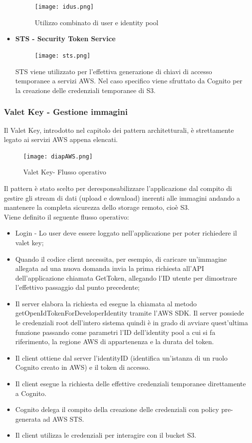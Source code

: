 \documentclass[12pt]{article}
\begin{document}
\begin{itemize}
\begin{itemize}
				\end{itemize}
				\begin{figure}[H]
					\texttt{[image: idus.png]}
					\caption{Utilizzo combinato di user e identity pool}
				\end{figure}
				\item \textbf{STS - Security Token Service}
				\begin{figure}[H]
					\texttt{[image: sts.png]}
				\end{figure}
				STS viene utilizzato per l'effettiva generazione di chiavi di accesso temporanee a servizi AWS. Nel caso specifico viene sfruttato da Cognito per la creazione delle credenziali temporanee di S3.
				
			\end{itemize}
			
			\newpage
			\subsubsection{Valet Key - Gestione immagini}
			\label{sec:valet}
			Il Valet Key, introdotto nel capitolo dei pattern architetturali, è strettamente legato ai servizi AWS appena elencati.
			\begin{figure}[H]
				\texttt{[image: diapAWS.png]}
				\caption{Valet Key- Flusso operativo}
			\end{figure}
			Il pattern è stato scelto per deresponsabilizzare l'applicazione dal compito di gestire gli stream di dati (upload e download) inerenti alle immagini andando a mantenere la completa sicurezza dello storage remoto, cioè S3.\\
			Viene definito il seguente flusso operativo:
			\begin{itemize}
				\item Login - Lo user deve essere loggato nell'applicazione per poter richiedere il valet key;
				\item Quando il codice client necessita, per esempio, di caricare un'immagine allegata ad una nuova domanda invia la prima richiesta all'API dell'applicazione chiamata GetToken, allegando l'ID utente per dimostrare l'effettivo passaggio dal punto precedente;
				\item Il server elabora la richiesta ed esegue la chiamata al metodo getOpenIdTokenForDeveloperIdentity tramite l'AWS SDK. Il server possiede le credenziali root dell'intero sistema quindi è in grado di avviare quest'ultima funzione passando come parametri l'ID dell'identity pool a cui si fa riferimento, la regione AWS di appartenenza e la durata del token.
				\item Il client ottiene dal server l'identityID (identifica un'istanza di un ruolo Cognito creato in AWS) e il token di accesso.
				\item Il client esegue la richiesta delle effettive credenziali temporanee direttamente a Cognito.
				\item Cognito delega il compito della creazione delle credenziali con policy pre-generata ad AWS STS.
				\item Il client utilizza le credenziali per interagire con il bucket S3.
			\end{itemize}
\end{document}
